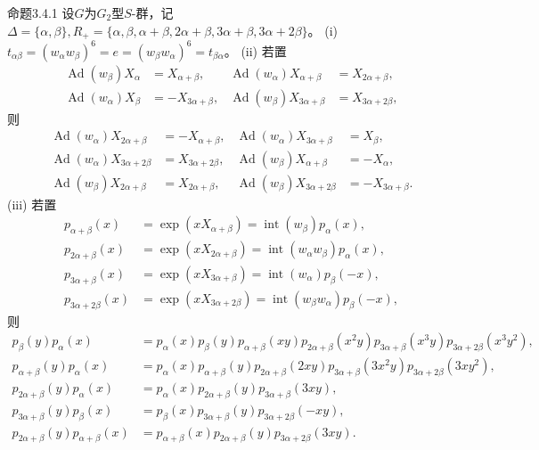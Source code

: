 \begin{SGAresult}{命题}{3.4.1}
设$G$为$G_2$型$S$-群，记$\Delta=\{\alpha,\beta\},R_+=\{\alpha,\beta,\alpha+\beta,2\alpha+\beta,3\alpha+\beta,3\alpha+2\beta\}$。
(i) $t_{\alpha\beta}=(w_\alpha w_\beta)^6=e=(w_\beta w_\alpha)^6=t_{\beta\alpha}$。
(ii) 若置
\[\begin{aligned}\operatorname{Ad}(w_\beta)X_\alpha&=X_{\alpha+\beta},&\operatorname{Ad}(w_\alpha)X_{\alpha+\beta}&=X_{2\alpha+\beta},\\\operatorname{Ad}(w_\alpha)X_\beta&=-X_{3\alpha+\beta},&\operatorname{Ad}(w_\beta)X_{3\alpha+\beta}&=X_{3\alpha+2\beta},\end{aligned}\]
则
\[\begin{aligned}\operatorname{Ad}(w_\alpha)X_{2\alpha+\beta}&=-X_{\alpha+\beta},&\operatorname{Ad}(w_\alpha)X_{3\alpha+\beta}&=X_\beta,\\\operatorname{Ad}(w_\alpha)X_{3\alpha+2\beta}&=X_{3\alpha+2\beta},&\operatorname{Ad}(w_\beta)X_{\alpha+\beta}&=-X_\alpha,\\\operatorname{Ad}(w_\beta)X_{2\alpha+\beta}&=X_{2\alpha+\beta},&\operatorname{Ad}(w_\beta)X_{3\alpha+2\beta}&=-X_{3\alpha+\beta}.\end{aligned}\]
(iii) 若置
\[\begin{aligned}p_{\alpha+\beta}(x)&=\exp(xX_{\alpha+\beta})=\operatorname{int}(w_\beta)p_\alpha(x),\\p_{2\alpha+\beta}(x)&=\exp(xX_{2\alpha+\beta})=\operatorname{int}(w_\alpha w_\beta)p_\alpha(x),\\p_{3\alpha+\beta}(x)&=\exp(xX_{3\alpha+\beta})=\operatorname{int}(w_\alpha)p_\beta(-x),\\p_{3\alpha+2\beta}(x)&=\exp(xX_{3\alpha+2\beta})=\operatorname{int}(w_\beta w_\alpha)p_\beta(-x),\end{aligned}\]
则
\[\begin{aligned}p_\beta(y)p_\alpha(x)&=p_\alpha(x)p_\beta(y)p_{\alpha+\beta}(xy)p_{2\alpha+\beta}(x^2y)p_{3\alpha+\beta}(x^3y)p_{3\alpha+2\beta}(x^3y^2),\\p_{\alpha+\beta}(y)p_\alpha(x)&=p_\alpha(x)p_{\alpha+\beta}(y)p_{2\alpha+\beta}(2xy)p_{3\alpha+\beta}(3x^2y)p_{3\alpha+2\beta}(3xy^2),\\p_{2\alpha+\beta}(y)p_\alpha(x)&=p_\alpha(x)p_{2\alpha+\beta}(y)p_{3\alpha+\beta}(3xy),\\p_{3\alpha+\beta}(y)p_\beta(x)&=p_\beta(x)p_{3\alpha+\beta}(y)p_{3\alpha+2\beta}(-xy),\\p_{2\alpha+\beta}(y)p_{\alpha+\beta}(x)&=p_{\alpha+\beta}(x)p_{2\alpha+\beta}(y)p_{3\alpha+2\beta}(3xy).\end{aligned}\]
\end{SGAresult}

